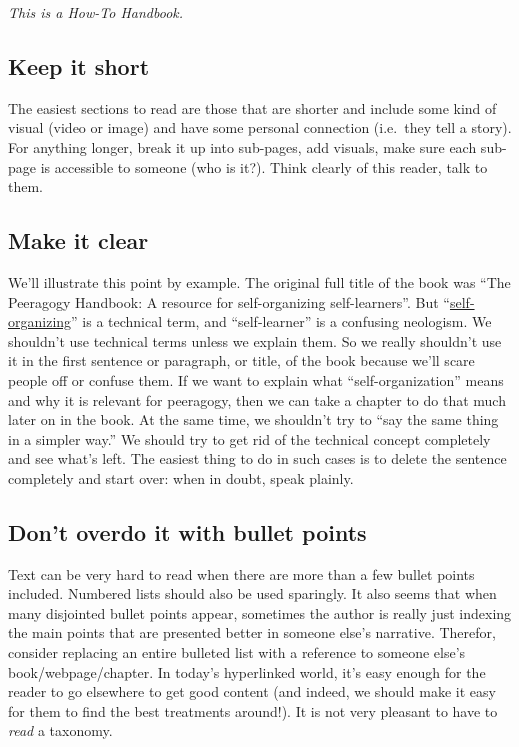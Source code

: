 \emph{This is a How-To Handbook.}

\subsection{Keep it short}\label{keep-it-short}

The easiest sections to read are those that are shorter and include some
kind of visual (video or image) and have some personal connection
(i.e.~they tell a story). For anything longer, break it up into
sub-pages, add visuals, make sure each sub-page is accessible to someone
(who is it?). Think clearly of this reader, talk to them.

\subsection{Make it clear}\label{make-it-clear}

We'll illustrate this point by example. The original full title of the
book was ``The Peeragogy Handbook: A resource for self-organizing
self-learners''. But
``\href{http://en.wikipedia.org/wiki/Self-organization}{self-organizing}''
is a technical term, and ``self-learner'' is a confusing neologism. We
shouldn't use technical terms unless we explain them. So we really
shouldn't use it in the first sentence or paragraph, or title, of the
book because we'll scare people off or confuse them. If we want to
explain what ``self-organization'' means and why it is relevant for
peeragogy, then we can take a chapter to do that much later on in the
book. At the same time, we shouldn't try to ``say the same thing in a
simpler way.'' We should try to get rid of the technical concept
completely and see what's left. The easiest thing to do in such cases is
to delete the sentence completely and start over: when in doubt, speak
plainly.

\subsection{Don't overdo it with bullet
points}\label{dont-overdo-it-with-bullet-points}

Text can be very hard to read when there are more than a few bullet
points included. Numbered lists should also be used sparingly. It also
seems that when many disjointed bullet points appear, sometimes the
author is really just indexing the main points that are presented better
in someone else's narrative. Therefor, consider replacing an entire
bulleted list with a reference to someone else's book/webpage/chapter.
In today's hyperlinked world, it's easy enough for the reader to go
elsewhere to get good content (and indeed, we should make it easy for
them to find the best treatments around!). It is not very pleasant to
have to \emph{read} a taxonomy.


